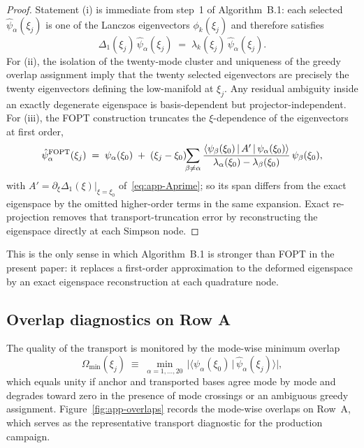 \documentclass[a4paper,11pt]{article}
\theoremstyle{definition}
\begin{document}
\begin{proof}
Statement (i) is immediate from step~1 of Algorithm~B.1: each selected
$\hat\psi_\alpha(\xi_j)$ is one of the Lanczos eigenvectors
$\phi_k(\xi_j)$ and therefore satisfies
\[
\Delta_1(\xi_j)\,\hat\psi_\alpha(\xi_j)
\;=\;
\lambda_k(\xi_j)\,\hat\psi_\alpha(\xi_j).
\]
For (ii), the isolation of the twenty-mode cluster and uniqueness of the
greedy overlap assignment imply that the twenty selected eigenvectors
are precisely the twenty eigenvectors defining the low-manifold at
$\xi_j$. Any residual ambiguity inside an exactly degenerate eigenspace
is basis-dependent but projector-independent. For (iii), the FOPT
construction truncates the $\xi$-dependence of the eigenvectors at first
order,
\begin{equation}
\hat\psi_\alpha^{\rm FOPT}(\xi_j)
\;=\;
\psi_\alpha(\xi_0)
\;+\;
(\xi_j - \xi_0)\!\!\sum_{\beta \neq \alpha}
\frac{\langle\psi_\beta(\xi_0)\,|\,A'\,|\,\psi_\alpha(\xi_0)\rangle}
     {\lambda_\alpha(\xi_0) - \lambda_\beta(\xi_0)}\,
\psi_\beta(\xi_0),
\label{eq:app-FOPT}
\end{equation}
with $A' = \partial_\xi \Delta_1(\xi)\bigr|_{\xi=\xi_0}$
of~\eqref{eq:app-Aprime}; so its span differs from the exact eigenspace
by the omitted higher-order terms in the same expansion. Exact
re-projection removes that transport-truncation error by reconstructing
the eigenspace directly at each Simpson node.
\end{proof}

This is the only sense in which Algorithm~B.1 is stronger than FOPT in
the present paper: it replaces a first-order approximation to the
deformed eigenspace by an exact eigenspace reconstruction at each
quadrature node.

\subsection{Overlap diagnostics on Row A}
\label{app:transport-overlaps}

The quality of the transport is monitored by the mode-wise minimum
overlap
\begin{equation}
\Omega_{\min}(\xi_j)
\;\equiv\;
\min_{\alpha = 1,\dots,20}\,
\bigl|\langle\psi_\alpha(\xi_0)\,|\,\hat\psi_\alpha(\xi_j)\rangle\bigr|,
\label{eq:app-Omega-min}
\end{equation}
which equals unity if anchor and transported bases agree mode by mode
and degrades toward zero in the presence of mode crossings or an
ambiguous greedy assignment. Figure~\ref{fig:app-overlaps} records the
mode-wise overlaps on Row~A, which serves as the representative
transport diagnostic for the production campaign.
\end{document}
